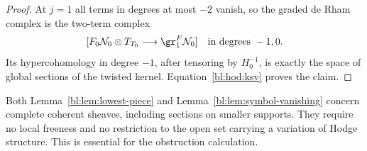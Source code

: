 \begin{proof}
At $j=1$ all terms in degrees at most $-2$ vanish, so the graded
de Rham complex is the two-term complex
\[
 [F_0\mathcal N_0\otimes T_{T_0}\longrightarrow\gr_1^F\mathcal N_0]
 \quad\text{in degrees }-1,0.
\]
Its hypercohomology in degree $-1$, after tensoring by $H_0^{-1}$,
is exactly the space of global sections of the twisted kernel.
Equation~\eqref{bl:hod:ksv} proves the claim.
\end{proof}

\begin{remark}\label{bl:hod:whole-sheaf}
Both Lemma~\ref{bl:lem:lowest-piece} and
Lemma~\ref{bl:lem:symbol-vanishing} concern complete coherent sheaves,
including sections on smaller supports. They require no local
freeness and no restriction to the open set carrying a variation
of Hodge structure. This is essential for the obstruction calculation.
\end{remark}
